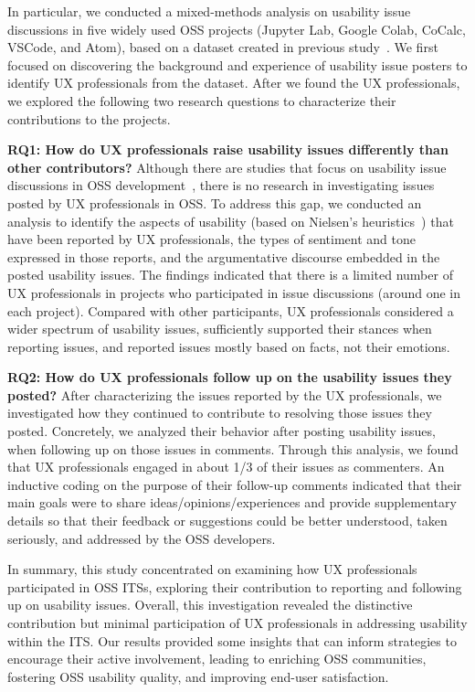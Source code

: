 In particular, we conducted a mixed-methods analysis on usability issue discussions in five widely used OSS projects (Jupyter Lab, Google Colab, CoCalc, VSCode, and Atom), based on a dataset created in previous study~\cite{sanei2023characterizing}. We first focused on discovering the background and experience of usability issue posters to identify UX professionals from the dataset. After we found the UX professionals, we explored the following two research questions to characterize their contributions to the projects.

\textbf{RQ1: How do UX professionals raise usability issues differently than other contributors?}
Although there are studies that focus on usability issue discussions in OSS development~\cite{arora2013state, garcia2017challenges, sharma2018usability, sanei2023characterizing}, there is no research in investigating issues posted by UX professionals in OSS. To address this gap, we conducted an analysis to identify the aspects of usability (based on Nielsen's heuristics~\cite{nielsen2005ten}) that have been reported by UX professionals, the types of sentiment and tone expressed in those reports, and the argumentative discourse embedded in the posted usability issues. The findings indicated that there is a limited number of UX professionals in projects who participated in issue discussions (around one in each project). Compared with other participants, UX professionals considered a wider spectrum of usability issues, sufficiently supported their stances when reporting issues, and reported issues mostly based on facts, not their emotions. 

\textbf{RQ2: How do UX professionals follow up on the usability issues they posted?}
After characterizing the issues reported by the UX professionals, we investigated how they continued to contribute to resolving those issues they posted. Concretely, we analyzed their behavior after posting usability issues, when following up on those issues in comments. Through this analysis, we found that UX professionals engaged in about 1/3 of their issues as commenters. An inductive coding on the purpose of their follow-up comments indicated that their main goals were to share ideas/opinions/experiences and provide supplementary details so that their feedback or suggestions could be better understood, taken seriously, and addressed by the OSS developers.

In summary, this study concentrated on examining how UX professionals participated in OSS ITSs, exploring their contribution to reporting and following up on usability issues. Overall, this investigation revealed the distinctive contribution but minimal participation of UX professionals in addressing usability within the ITS. Our results provided some insights that can inform strategies to encourage their active involvement, leading to enriching OSS communities, fostering OSS usability quality, and improving end-user satisfaction.